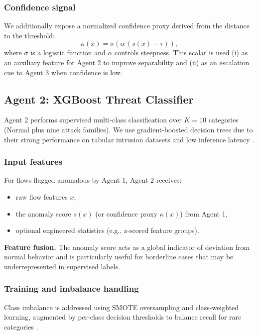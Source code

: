 \subsubsection{Confidence signal}
We additionally expose a normalized confidence proxy derived from the distance to the threshold:
\begin{equation}
 \kappa(x) = \sigma\left(\alpha\,(s(x)-\tau)\right),
\end{equation}
where $\sigma$ is a logistic function and $\alpha$ controls steepness. This scalar is used (i) as an auxiliary feature for Agent 2 to improve separability and (ii) as an escalation cue to Agent 3 when confidence is low.

\subsection{Agent 2: XGBoost Threat Classifier}
\label{sec:agent2_method}

Agent 2 performs supervised multi-class classification over $K=10$ categories (Normal plus nine attack families). We use gradient-boosted decision trees due to their strong performance on tabular intrusion datasets and low inference latency \cite{Chen2016XGBoost}.

\subsubsection{Input features}
For flows flagged anomalous by Agent 1, Agent 2 receives:
\begin{itemize}
  \item raw flow features $x$,
  \item the anomaly score $s(x)$ (or confidence proxy $\kappa(x)$) from Agent 1,
  \item optional engineered statistics (e.g., z-scored feature groups).
\end{itemize}

\textbf{Feature fusion.} The anomaly score acts as a global indicator of deviation from normal behavior and is particularly useful for borderline cases that may be underrepresented in supervised labels.

\subsubsection{Training and imbalance handling}
Class imbalance is addressed using SMOTE oversampling and class-weighted learning, augmented by per-class decision thresholds to balance recall for rare categories \cite{Chawla2002SMOTE}.

